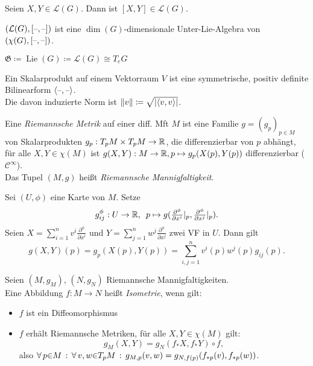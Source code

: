 \documentclass{cheat-sheet}
\newcommand{\coord}[1]{\tfrac{\partial^\phi}{\partial x^{#1}}} %
\newcommand{\Gie}{\mathfrak{G}} %
\DeclareMathOperator{\Lie}{Lie} %
\newcommand{\Cont}{\mathcal{C}} %
\begin{document}
\begin{lem}
  Seien $X, Y \in \mathcal{L}(G)$. Dann ist $[X, Y] \in \mathcal{L}(G)$.
\end{lem}

\begin{kor}
  $(\mathcal{L}(G), [\text{--},\text{--}])$ ist eine $\dim(G)$-dimensionale Unter-Lie-Algebra von $(\chi(G), [\text{--},\text{--}])$.
\end{kor}

\begin{nota}
  $\Gie \coloneqq \Lie(G) \coloneqq \mathcal{L}(G) \cong T_e G$
\end{nota}


\begin{defn}
  Ein Skalarprodukt auf einem Vektorraum $V$ ist eine symmetrische, positiv definite Bilinearform $\langle \text{--}, \text{--} \rangle$. \\
  Die davon induzierte Norm ist $\lVert v\rVert \coloneqq \sqrt{\lvert\langle v, v \rangle\rvert}$.
\end{defn}

\begin{defn}
  Eine \emph{Riemannsche Metrik} auf einer diff. Mft $M$ ist eine Familie $g = (g_p)_{p \in M}$ von Skalarprodukten $g_p : T_p M \times T_p M \to \mathbb{R}$, die differenzierbar von $p$ abhängt, \dh{} für alle $X, Y \in \chi(M)$ ist $g(X, Y) : M \to \mathbb{R}, p \mapsto g_p(X(p), Y(p))$ differenzierbar ($\Cont^\infty$).\\
  Das Tupel $(M, g)$ heißt \emph{Riemannsche Mannigfaltigkeit}.
\end{defn}

\begin{bem}
  Sei $(U, \phi)$ eine Karte von $M$. Setze
  \[
    g_{ij}^{\phi} : U \to \R, \enspace
    p \mapsto g(\coord{i}|_p, \coord{j}|_p).
  \]
  Seien $X = \sum_{i=1}^n v^i \coord{i}$ und $Y = \sum_{j=1}^n w^j \coord{j}$ zwei VF in $U$. Dann gilt
  \[
    g(X, Y)(p) = g_p(X(p), Y(p)) = \sum_{i,j=1}^n v^i(p) w^j(p) g_{ij}(p).
  \]
\end{bem}

\begin{defn}
  Seien $(M, g_M)$, $(N, g_N)$ Riemannsche Mannigfaltigkeiten. \\
  Eine Abbildung $f : M \to N$ heißt \emph{Isometrie}, wenn gilt:
  \begin{itemize}
    \item $f$ ist ein Diffeomorphismus
    \item $f$ erhält Riemannsche Metriken, \dh{} für alle $X, Y \in \chi(M)$ gilt:
    \[ g_M(X, Y) = g_N(f_* X, f_* Y) \circ f, \]
    also $\forall \, {p {\in} M} \,:\, \forall \, {v, w {\in} T_p M} \,:\, g_{M,p} (v, w) = g_{N,f(p)}(f_{*p}(v), f_{*p}(w))$.
  \end{itemize}
\end{defn}
\end{document}
